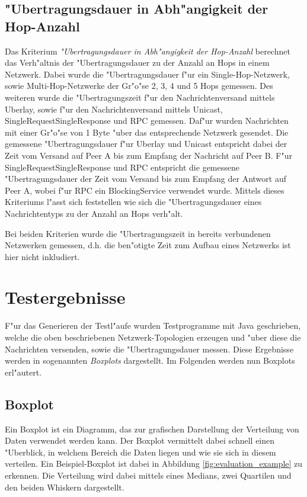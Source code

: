 \subsection{"Ubertragungsdauer in Abh"angigkeit der Hop-Anzahl}

Das Kriterium \emph{"Ubertragungsdauer in Abh"angigkeit der Hop-Anzahl} berechnet das Verh"altnis der "Uber\-tra\-gungs\-dauer zu der Anzahl an Hops in einem Netzwerk. Dabei wurde die "Uber\-tra\-gungs\-dauer f"ur ein Single-Hop-Netzwerk, sowie Multi-Hop-Netzwerke der Gr"o"se 2, 3, 4 und 5 Hops gemessen. Des weiteren wurde die "Ubertragungszeit f"ur den Nachrichtenversand mittels Uberlay, sowie f"ur den Nachrichtenversand mittels Unicast, SingleRequestSingleResponse und RPC gemessen. Daf"ur wurden Nachrichten mit einer Gr"o"se von 1 Byte "uber das entsprechende Netzwerk gesendet. Die gemessene "Uber\-tra\-gungs\-dauer f"ur Uberlay und Unicast entspricht dabei der Zeit vom Versand auf Peer A bis zum Empfang der Nachricht auf Peer B. F"ur SingleRequestSingleResponse und RPC entspricht die gemessene "Uber\-tra\-gungs\-dauer der Zeit vom Versand bis zum Empfang der Antwort auf Peer A, wobei f"ur RPC ein BlockingService verwendet wurde. Mittels dieses Kriteriums l"asst sich feststellen wie sich die "Uber\-tra\-gungs\-dauer eines Nachrichtentyps zu der Anzahl an Hops verh"alt.  

Bei beiden Kriterien wurde die "Ubertragungszeit in bereits verbundenen Netzwerken gemessen, d.h. die ben"otigte Zeit zum Aufbau eines Netzwerks ist hier nicht inkludiert. 

\section{Testergebnisse}
F"ur das Generieren der Testl"aufe wurden Testprogramme mit Java geschrieben, welche die oben beschriebenen Netzwerk-Topologien erzeugen und "uber diese die Nachrichten versenden, sowie die "Uber\-tra\-gungs\-dauer messen. Diese Ergebnisse werden in sogenannten \emph{Boxplots} dargestellt. Im Folgenden werden nun Boxplots erl"autert.

\subsection{Boxplot}
Ein Boxplot ist ein Diagramm, das zur grafischen Darstellung der Verteilung von Daten verwendet werden kann. Der Boxplot vermittelt dabei schnell einen "Uberblick, in welchem Bereich die Daten liegen und wie sie sich in diesem verteilen. Ein Beispiel-Boxplot ist dabei in Abbildung \ref{fig:evaluation_example} zu erkennen. Die Verteilung wird dabei mittels eines Medians, zwei Quartilen und den beiden Whiskern dargestellt.

